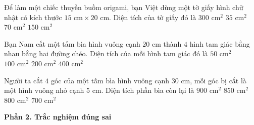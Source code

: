 \begin{ex} %
Để làm một chiếc thuyền buồm origami, bạn Việt dùng một tờ giấy hình chữ nhật có kích thước $15\text{ cm} \times 20\text{ cm}$. Diện tích của tờ giấy đó là
\choice
{\True $300\text{ cm}^2$}
{$35\text{ cm}^2$}
{$70\text{ cm}^2$}
{$150\text{ cm}^2$}
\end{ex}

\begin{ex} %
Bạn Nam cắt một tấm bìa hình vuông cạnh $20\text{ cm}$ thành $4$ hình tam giác bằng nhau bằng hai đường chéo. Diện tích của mỗi hình tam giác đó là
\choice
{$50\text{ cm}^2$}
{\True $100\text{ cm}^2$}
{$200\text{ cm}^2$}
{$400\text{ cm}^2$}
\end{ex}

\begin{ex} %
Người ta cắt $4$ góc của một tấm bìa hình vuông cạnh $30\text{ cm}$, mỗi góc bị cắt là một hình vuông nhỏ cạnh $5\text{ cm}$. Diện tích phần bìa còn lại là
\choice
{$900\text{ cm}^2$}
{$850\text{ cm}^2$}
{\True $800\text{ cm}^2$}
{$700\text{ cm}^2$}
\end{ex}

\textbf{Phần 2. Trắc nghiệm đúng sai}

